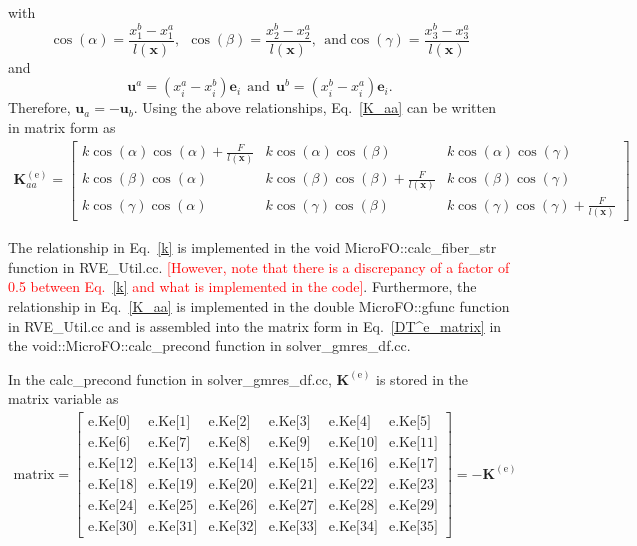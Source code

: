 \documentclass[12pt,aps,pre]{revtex4}
\newcommand{\red}[1]{\textcolor{red}{[#1]}}
\begin{document}
%
with
%
\begin{equation}
\cos(\alpha) = \frac{x^b_1 - x^a_1}{l(\textbf{x})}, \ \ \cos(\beta) = \frac{x^b_2 - x^a_2}{l(\textbf{x})}, \ \ \text{and} \cos(\gamma) = \frac{x^b_3 - x^a_3}{l(\textbf{x})} 
\end{equation}
%
and
%
\begin{equation}
\textbf{u}^a = (x^a_i - x^b_i) \textbf{e}_i \ \ \text{and} \ \ \textbf{u}^b = (x^b_i - x^a_i) \textbf{e}_i .
\end{equation}
%
Therefore, $\textbf{u}_a = -\textbf{u}_b$. Using the above relationships, Eq.\ \eqref{K_aa} can be written in matrix form as
%
\begin{eqnarray}
\textbf{K}^{(\text{e})}_{aa} =
\begin{bmatrix}
k \cos(\alpha)\cos(\alpha) + \frac{F}{l(\textbf{x})} & k \cos(\alpha)\cos(\beta) & k \cos(\alpha)\cos(\gamma) \\
k \cos(\beta)\cos(\alpha) & k \cos(\beta)\cos(\beta)+ \frac{F}{l(\textbf{x})}  & k \cos(\beta)\cos(\gamma) \\
k \cos(\gamma)\cos(\alpha) & k \cos(\gamma)\cos(\beta) & k \cos(\gamma)\cos(\gamma) + \frac{F}{l(\textbf{x})} 
\end{bmatrix}
\label{K^e_aa_matrix}
\end{eqnarray}
%

The relationship in Eq.\ \eqref{k} is implemented in the void MicroFO::calc\_fiber\_str function in RVE\_Util.cc. \red{However, note that there is a discrepancy of a factor of 0.5 between Eq.\ \eqref{k} and what is implemented in the code}. Furthermore, the relationship in Eq.\ \eqref{K_aa} is implemented in the double MicroFO::gfunc function in RVE\_Util.cc and is assembled into the matrix form in Eq.\ \eqref{DT^e_matrix} in the void::MicroFO::calc\_precond function in solver\_gmres\_df.cc.

In the calc\_precond function in solver\_gmres\_df.cc, $\textbf{K}^{(\text{e})}$ is stored in the matrix variable as
%
\begin{eqnarray}
\text{matrix} =
\begin{bmatrix}
\text{e.Ke[0]} & \text{e.Ke[1]} & \text{e.Ke[2]} & \text{e.Ke[3]} & \text{e.Ke[4]} & \text{e.Ke[5]} \\
\text{e.Ke[6]} & \text{e.Ke[7]} & \text{e.Ke[8]} & \text{e.Ke[9]} & \text{e.Ke[10]} & \text{e.Ke[11]} \\
\text{e.Ke[12]} & \text{e.Ke[13]} & \text{e.Ke[14]} & \text{e.Ke[15]} & \text{e.Ke[16]} & \text{e.Ke[17]} \\
\text{e.Ke[18]} & \text{e.Ke[19]} & \text{e.Ke[20]} & \text{e.Ke[21]} & \text{e.Ke[22]} & \text{e.Ke[23]} \\
\text{e.Ke[24]} & \text{e.Ke[25]} & \text{e.Ke[26]} & \text{e.Ke[27]} & \text{e.Ke[28]} & \text{e.Ke[29]} \\
\text{e.Ke[30]} & \text{e.Ke[31]} & \text{e.Ke[32]} & \text{e.Ke[33]} & \text{e.Ke[34]} & \text{e.Ke[35]} 
\end{bmatrix} = -\textbf{K}^{(\text{e})}
\label{matrix}
\end{eqnarray}
%
\end{document}
